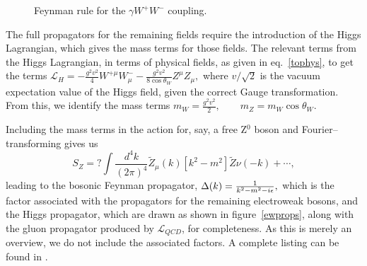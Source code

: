 \begin{figure}[htbp]
\begin{minipage}[b]{.69\textwidth}\centering\footnotesize
{}
\end{minipage}\hfill
\begin{minipage}[b]{.3\textwidth}
\caption{Feynman rule for the $\gamma W^{+}W^{-}$ coupling.}
\label{wwgam}
\end{minipage}
\end{figure}

The full propagators for the remaining fields require the introduction of the Higgs Lagrangian, which gives the mass terms for those fields. The relevant terms from the Higgs Lagrangian, in terms of physical fields, as given in eq.~\eqref{tophys}, to get the terms
\(\mathcal{L}_H=-\frac{g^2v^2}{4}W^{+\mu}W^{-}_\mu-\frac{g^2v^2}{8\cos\theta_W}Z^\mu Z_\mu,\)
where $v/\sqrt{2}$ is the vacuum expectation value of the Higgs field, given the correct Gauge transformation. From this, we identify the mass terms
\(m_W=\frac{g^2v^2}{2},\qquad m_Z=m_W\cos\theta_W.\)

Including the mass terms in the action for, say, a free Z$^0$ boson and Fourier--transforming gives us
\[S_Z=?\int\frac{d^4k}{(2\pi)^4}\tilde Z_\mu(k)[k^2-m^2]\tilde Z\nu(-k) +\cdots,\]
leading to the bosonic Feynman propagator,
\(\Delta(k)=\frac{1}{k^2-m^2-i\epsilon},\)
which is the factor associated with the propagators for the remaining electroweak bosons, and the Higgs propagator, which are drawn as shown in figure~\ref{ewprops}, along with the gluon propagator produced by $\mathcal{L}_\textit{QCD}$, for completeness. As this is merely an overview, we do not include the associated factors. A complete listing can be found in \cite{allfrules}.

